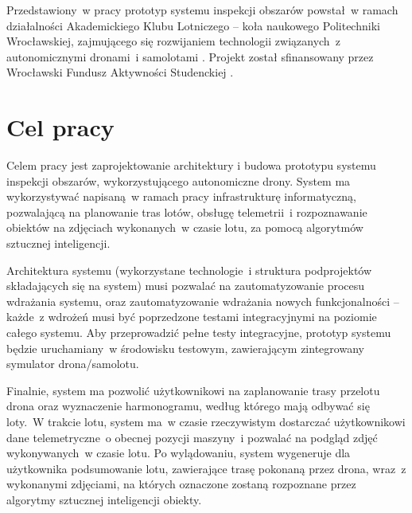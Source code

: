 Przedstawiony~w pracy prototyp systemu inspekcji obszarów powstał~w ramach działalności
Akademickiego Klubu Lotniczego -- koła naukowego Politechniki Wrocławskiej, zajmującego
się rozwijaniem technologii związanych~z autonomicznymi dronami~i samolotami
\cite{akl_home_page}. Projekt został sfinansowany przez Wrocławski Fundusz
Aktywności Studenckiej \cite{fast_webpage}.


\section{Cel pracy} \label{intro_objective}

Celem pracy jest zaprojektowanie architektury i budowa prototypu systemu inspekcji obszarów,
wykorzystującego autonomiczne drony. %
System ma wykorzystywać napisaną~w ramach pracy
infrastrukturę informatyczną, pozwalającą na planowanie tras lotów, obsługę telemetrii~i
rozpoznawanie obiektów na zdjęciach wykonanych~w czasie lotu, za pomocą algorytmów
sztucznej inteligencji. 

Architektura systemu (wykorzystane technologie~i struktura podprojektów składających
się na system) musi pozwalać na zautomatyzowanie procesu wdrażania
systemu, oraz zautomatyzowanie wdrażania nowych funkcjonalności -- każde~z wdrożeń musi
być poprzedzone testami integracyjnymi na poziomie całego systemu.
Aby przeprowadzić pełne testy integracyjne, prototyp systemu będzie uruchamiany~w
środowisku testowym, zawierającym zintegrowany symulator drona/samolotu.

Finalnie, system ma pozwolić użytkownikowi na zaplanowanie trasy przelotu drona
oraz wyznaczenie harmonogramu, według którego mają odbywać się loty.~W trakcie 
lotu, system ma~w czasie rzeczywistym dostarczać użytkownikowi dane telemetryczne~o
obecnej pozycji maszyny~i pozwalać na podgląd zdjęć wykonywanych~w czasie lotu.
Po wylądowaniu, system wygeneruje dla użytkownika podsumowanie lotu, zawierające
trasę pokonaną przez drona, wraz~z wykonanymi zdjęciami, na których oznaczone zostaną
rozpoznane przez algorytmy sztucznej inteligencji obiekty.


